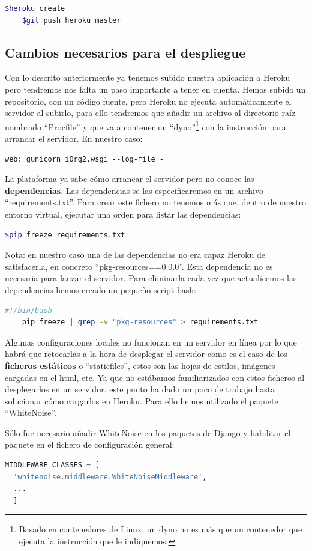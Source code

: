   \begin{lstlisting}[language=bash]
    $heroku create
    $git push heroku master
  \end{lstlisting}


\subsection{Cambios necesarios para el despliegue}

\bigskip
  Con lo descrito anteriormente ya tenemos subido nuestra aplicación a Heroku pero tendremos nos falta un paso importante a tener en cuenta. Hemos subido un repositorio, con un código fuente, pero Heroku no ejecuta automáticamente el servidor al subirlo, para ello tendremos que añadir un archivo al directorio raíz nombrado ``Procfile'' y que va a contener un ``dyno''\footnote{Basado en contenedores de Linux, un dyno no es más que un contenedor que ejecuta la instrucción que le indiquemos.} con la instrucción para arrancar el servidor. En nuestro caso: 

  \begin{lstlisting}[language=text]
    web: gunicorn iOrg2.wsgi --log-file -
  \end{lstlisting}

\bigskip
La plataforma ya sabe cómo arrancar el servidor pero no conoce las \textbf{dependencias}. Las dependencias se las especificaremos en un archivo ``requirements.txt''. Para crear este fichero no tenemos más que, dentro de nuestro entorno virtual, ejecutar una orden para listar las dependencias:

\begin{lstlisting}[language=bash]
    $pip freeze requirements.txt
\end{lstlisting}

\bigskip
Nota: en nuestro caso una de las dependencias no era capaz Heroku de satisfacerla, en concreto ``pkg-resources==0.0.0''. Esta dependencia no es necesaria para lanzar el servidor. Para eliminarla cada vez que actualicemos las dependencias hemos creado un pequeño script bash:

\begin{lstlisting}[language=bash]
    #!/bin/bash
    pip freeze | grep -v "pkg-resources" > requirements.txt
\end{lstlisting}


\bigskip
  Algunas configuraciones locales no funcionan en un servidor en línea por lo que habrá que retocarlas a la hora de desplegar el servidor como es el caso de los \textbf{ficheros estáticos} o ``staticfiles'', estos son las hojas de estilos, imágenes cargadas en el html, etc. Ya que no estábamos familiarizados con estos ficheros al desplegarlos en un servidor, este punto ha dado un poco de trabajo hasta solucionar cómo cargarlos en Heroku. Para ello hemos utilizado el paquete ``WhiteNoise''.
  
\bigskip
Sólo fue necesario añadir WhiteNoise en los paquetes de Django y habilitar el paquete en el fichero de configuración general: 

\begin{lstlisting}[language=python]
  MIDDLEWARE_CLASSES = [
  'whitenoise.middleware.WhiteNoiseMiddleware',
  ...
  ]    
\end{lstlisting}




